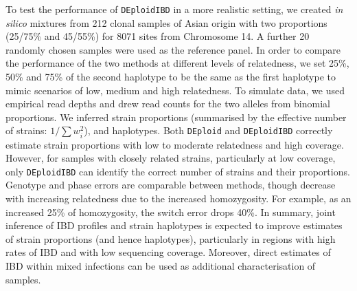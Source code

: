 \documentclass[9pt,lineno]{elife}
\begin{document}
To test the performance of \texttt{DEploidIBD} in a more realistic setting, we created {\it in silico} mixtures from 212 clonal samples of Asian origin with two proportions (25/75\% and 45/55\%) for 8071 sites from Chromosome 14.  A further 20 randomly chosen samples were used as the reference panel. In order to compare the performance of the two methods at different levels of relatedness, we set 25\%, 50\% and 75\% of the second haplotype to be the same as the first haplotype to mimic scenarios of low, medium and high relatedness. To simulate data, we used empirical read depths and drew read counts for the two alleles from binomial proportions.  We inferred strain proportions (summarised by the effective number of strains: $1/\sum w_{i}^{2}$), and haplotypes.  Both \texttt{DEploid} and \texttt{DEploidIBD} correctly estimate strain proportions with low to moderate relatedness and high coverage.  However, for samples with closely related strains, particularly at low coverage, only \texttt{DEploidIBD} can identify the correct number of strains and their proportions.  Genotype and phase errors are comparable between methods, though decrease with increasing relatedness due to the increased homozygosity. For example, as an increased 25\% of homozygosity, the switch error drops 40\%.  In summary, joint inference of IBD profiles and strain haplotypes is expected to improve estimates of strain proportions (and hence haplotypes), particularly in regions with high rates of IBD and with low sequencing coverage.  Moreover, direct estimates of IBD within mixed infections can be used as additional characterisation of samples.
\end{document}
